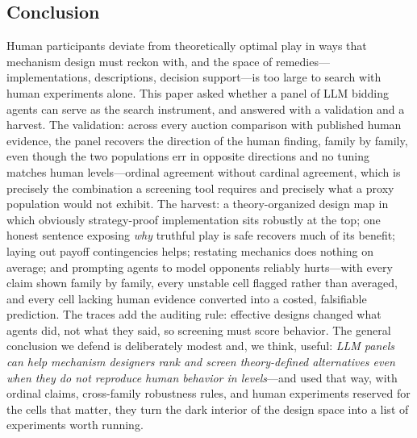 \subsection{Conclusion}\label{sec:conclusion}

Human participants deviate from theoretically optimal play in ways that mechanism design must reckon with, and the space of remedies---implementations, descriptions, decision support---is too large to search with human experiments alone. This paper asked whether a panel of LLM bidding agents can serve as the search instrument, and answered with a validation and a harvest. The validation: across every auction comparison with published human evidence, the panel recovers the direction of the human finding, family by family, even though the two populations err in opposite directions and no tuning matches human levels---ordinal agreement without cardinal agreement, which is precisely the combination a screening tool requires and precisely what a proxy population would not exhibit. The harvest: a theory-organized design map in which obviously strategy-proof implementation sits robustly at the top; one honest sentence exposing \emph{why} truthful play is safe recovers much of its benefit; laying out payoff contingencies helps; restating mechanics does nothing on average; and prompting agents to model opponents reliably hurts---with every claim shown family by family, every unstable cell flagged rather than averaged, and every cell lacking human evidence converted into a costed, falsifiable prediction. The traces add the auditing rule: effective designs changed what agents did, not what they said, so screening must score behavior. The general conclusion we defend is deliberately modest and, we think, useful: \emph{LLM panels can help mechanism designers rank and screen theory-defined alternatives even when they do not reproduce human behavior in levels}---and used that way, with ordinal claims, cross-family robustness rules, and human experiments reserved for the cells that matter, they turn the dark interior of the design space into a list of experiments worth running.
